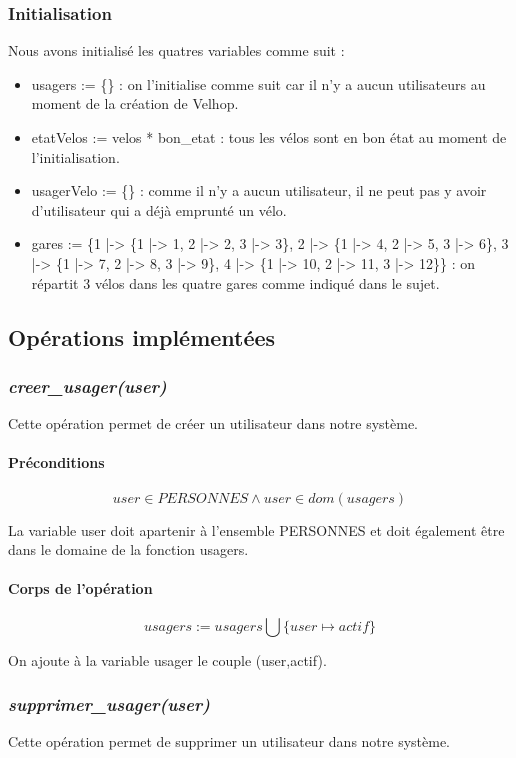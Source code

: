 \documentclass[12pt]{article}
\begin{document}
\subsubsection{Initialisation}
Nous avons initialisé les quatres variables comme suit :
\begin{itemize}
  \item usagers := \{\} : on l'initialise comme suit car il n'y a aucun utilisateurs au moment de la création de Velhop.
  \item etatVelos := velos * {bon\_etat} : tous les vélos sont en bon état au moment de l'initialisation.
  \item usagerVelo := \{\} : comme il n'y a aucun utilisateur, il ne peut pas y avoir d'utilisateur qui a déjà emprunté un vélo.
  \item gares := \{1 |-> \{1 |-> 1, 2 |-> 2, 3 |-> 3\}, 2 |-> \{1 |-> 4, 2 |-> 5, 3 |-> 6\}, 3 |-> \{1 |-> 7, 2 |-> 8, 3 |-> 9\}, 4 |-> \{1 |-> 10, 2 |-> 11, 3 |-> 12\}\} : on répartit 3 vélos dans les quatre gares comme indiqué dans le sujet.
\end{itemize}
\subsection{Opérations implémentées}
\subsubsection{\textit{creer\_usager(user)}}
Cette opération permet de créer un utilisateur dans notre système.
\paragraph{Préconditions}
\[user \in PERSONNES \land user \in dom(usagers)\]

La variable user doit apartenir à l'ensemble PERSONNES et doit également être dans le domaine de la fonction usagers.
\paragraph{Corps de l'opération}
\[ usagers := usagers \bigcup \{user \mapsto actif\} \]

On ajoute à la variable usager le couple (user,actif).
\subsubsection{\textit{supprimer\_usager(user)}}
Cette opération permet de supprimer un utilisateur dans notre système.
\end{document}
